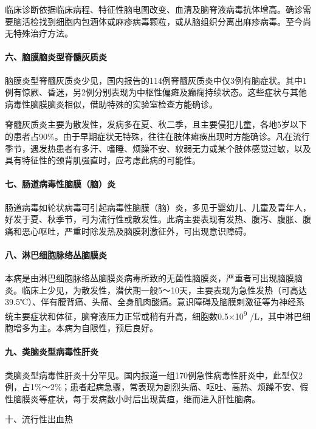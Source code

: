 临床诊断依据临床病程、特征性脑电图改变、血清及脑脊液病毒抗体增高。确诊需要脑活检找到细胞内包涵体或麻疹病毒颗粒，或从脑组织分离出麻疹病毒。至今尚无特殊治疗方法。

\paragraph{六、脑膜脑炎型脊髓灰质炎}

脑膜炎型脊髓灰质炎少见，国内报告的114例脊髓灰质炎中仅3例有脑症状。其中1例有惊厥、昏迷，另2例分别表现为中枢性偏瘫及癫痫持续状态。这些症状与其他病毒性脑膜脑炎相似，借助特殊的实验室检查方能确诊。

脊髓灰质炎主要为散发性，发病多在夏、秋二季，且主要侵犯儿童，各地5岁以下的患者占90\%。由于早期症状无特殊，往往在肢体瘫痪出现时方能确诊。凡在流行季节，遇发热患者有多汗、嗜睡、烦躁不安、软弱无力或某个肢体感觉过敏，以及具有特征性的颈背肌强直时，应考虑此病的可能性。

\paragraph{七、肠道病毒性脑膜（脑）炎}

肠道病毒如轮状病毒可引起病毒性脑膜（脑）炎，多见于婴幼儿、儿童及青年人，好发于夏、秋季节，可为流行性或散发性。此病主要表现有发热、腹泻、腹胀、腹痛和恶心呕吐，严重时除发热及脑膜刺激征外，可出现意识障碍。

\paragraph{八、淋巴细胞脉络丛脑膜炎}

本病是由淋巴细胞脉络丛脑膜炎病毒所致的无菌性脑膜炎，严重者可出现脑膜脑炎。临床上少见，为散发性，潜伏期一般5～10天，主要表现为急性发热（可高达39.5℃）、伴有腰背痛、头痛、全身肌肉酸痛。意识障碍及脑膜刺激征等为神经系统主要症状和体征，脑脊液压力正常或稍有升高，细胞数0.5×10\textsuperscript{9}
/L，其中淋巴细胞增多为主。本病为自限性，预后良好。

\paragraph{九、类脑炎型病毒性肝炎}

类脑炎型病毒性肝炎十分罕见。国内报道一组170例急性病毒性肝炎中，此型仅2例，占1\%～2\%；患者起病急骤，常表现为剧烈头痛、呕吐、高热、烦躁不安、假性脑膜炎等症状，每于发病数小时后出现黄疸，继而进入肝性脑病。

\hypertarget{text00370.htmlux5cux23CHP49-5-1-1-10}{}
十、流行性出血热


